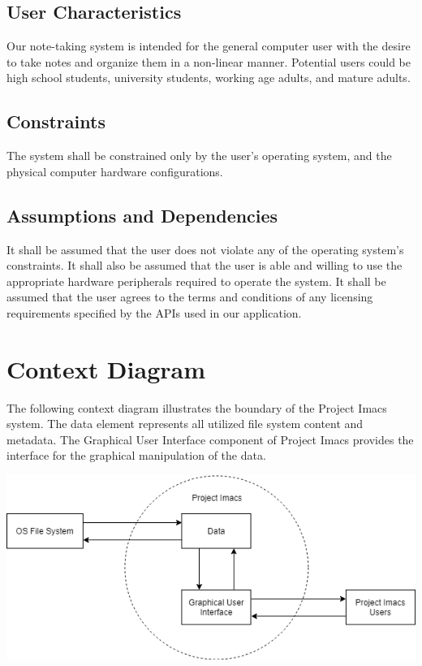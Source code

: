 \documentclass{article}
\begin{document}
\subsection{User Characteristics}
Our note-taking system is intended for the general computer user with the desire to take notes and organize them in a non-linear manner. Potential users could be high school students, university students, working age adults, and mature adults.

\subsection{Constraints}
The system shall be constrained only by the user's operating system, and the physical computer hardware configurations.

\subsection{Assumptions and Dependencies}
It shall be assumed that the user does not violate any of the operating system's constraints. It shall also be assumed that the user is able and willing to use the appropriate hardware peripherals required to operate the system.
It shall be assumed that the user agrees to the terms and conditions of any licensing requirements specified by the APIs used in our application.

\section{Context Diagram}
The following context diagram illustrates the boundary of the Project Imacs system. The data element represents all utilized file system content and metadata. The Graphical User Interface component of Project Imacs provides the interface for the graphical manipulation of the data.

\includegraphics[scale=0.5]{context_diagram.png}
\end{document}

